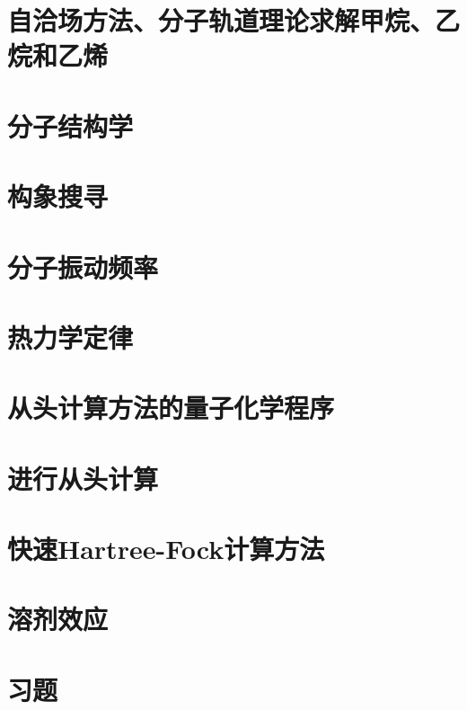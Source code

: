 \section{自洽场方法、分子轨道理论求解甲烷、乙烷和乙烯}
\label{sec:15.9 The SCF MO Treatment of Methane, Ethane, and Ethylene}

\section{分子结构学}
\label{sec:15.10 Molecular Geometry}

\section{构象搜寻}
\label{sec:15.11 Conformational Searching}

\section{分子振动频率}
\label{sec:15.12 Molecular Vibration Frequencies}

\section{热力学定律}
\label{sec:15.13 Thermodynamic Properties}

\section{从头计算方法的量子化学程序}
\label{sec:15.14 Ab Initio Quantum Chemistry Programs}

\section{进行从头计算}
\label{sec:15.15 Performing Ab Initio Calculations}

\section{快速Hartree-Fock计算方法}
\label{sec:15.16 Speeding Up Hartree-Fock Methods}

\section{溶剂效应}
\label{sec:15.17 Solvent Effects}

\section*{习题}